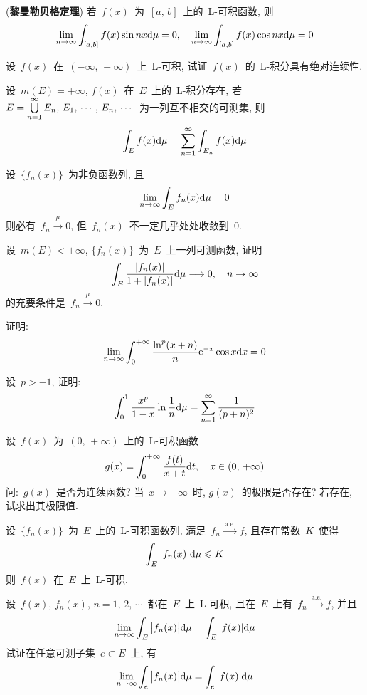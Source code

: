 \begin{problemset}
\item (\textbf{黎曼\raisebox{0.5mm}{--}勒贝格定理}) 若~$f(x)$~为~$[a,\,  b]$~上的~L-可积函数, 则
\[
\lim_{n \to \infty} \int_{[a, b]} f(x) \sin nx \mathrm{d} \mu = 0, \quad \lim_{n \to \infty} \int_{[a, b]} f(x) \cos nx \mathrm{d} \mu = 0
\]

\item 设~$f(x)$~在~$(-\infty,\,  +\infty)$~上~L-可积, 试证~$f(x)$~的~L-积分具有绝对连续性.

\item 设~$m(E) = +\infty$, $f(x)$~在~$E$~上的~L-积分存在, 若~$E = \mathop{\textstyle{\bigcup}}\limits_{n =1} ^\infty E_n,\,   E_1,\,  \cdots,\, E_n,\, \cdots$~为一列互不相交的可测集, 则
    \[
    \int_E f(x) \mathrm{d} \mu = \sum_{n=1}^\infty \int_{E_n} f(x) \mathrm{d} \mu
    \]

\item 设~$\{f_n(x)\}$~为非负函数列, 且
\[
\lim_{n \to \infty} \int_E f_n(x) \mathrm{d} \mu = 0
\]
则必有~$f_n \xrightarrow{~\mu~} 0$, 但~$f_n(x)$~不一定几乎处处收敛到~$0$.

\item 设~$m(E) < +\infty$, $\{f_n(x)\}$~为~$E$~上一列可测函数, 证明
\[
\int_E \dfrac{|f_n(x)|}{1+ |f_n(x)|} \mathrm{d} \mu \longrightarrow 0,\quad   n \to \infty
\]
的充要条件是~$f_n \xrightarrow{~\mu~} 0$.

\item 证明:
\[
\lim_{n \to \infty} \int_0 ^{+\infty} \frac{\ln^p (x+n)}{n} \mathrm{e}^{-x} \cos x \mathrm{d} x = 0
\]

\item 设~$p > -1$, 证明:
\[
\int_0^1 \frac{x^p}{1-x} \ln \frac{1}{n} \mathrm{d} \mu = \sum_{n=1}^\infty \frac{1}{(p+n)^2}
\]

\item 设~$f(x)$~为~$(0,\, +\infty)$~上的~L-可积函数
\[
g(x) = \int_0^{+\infty} \frac{f(t)}{x+t} \mathrm{d} t,  \quad x \in (0,\, +\infty)
\]
问:~$g(x)$~是否为连续函数? 当~$x \to +\infty$~时, $g(x)$~的极限是否存在? 若存在, 试求出其极限值.

\item 设~$\{f_n(x)\}$~为~$E$~上的~L-可积函数列, 满足~$f_n \xrightarrow{~\mathrm{a.e.}~} f$, 且存在常数~$K$~使得
    \[
    \int_E \big|f_n(x)\big| \mathrm{d} \mu \leqslant K
    \]
    则~$f(x)$~在~$E$~上~L-可积.

\item 设~$f(x),\,  f_n(x), \, n=1,\, 2,\, \cdots$~都在~$E$~上~L-可积, 且在~$E$~上有~$f_n \xrightarrow{~\mathrm{a.e.}~} f$, 并且
    \[
    \lim_{n \to \infty} \int_E \big| f_n(x) \big| \mathrm{d} \mu = \int_E |f(x)| \mathrm{d} \mu
    \]
    试证在任意可测子集~$e \subset E$~上, 有
    \[
    \lim_{n \to \infty} \int_e \big| f_n(x) \big| \mathrm{d} \mu = \int_e |f(x)| \mathrm{d} \mu
    \]


\end{problemset}
